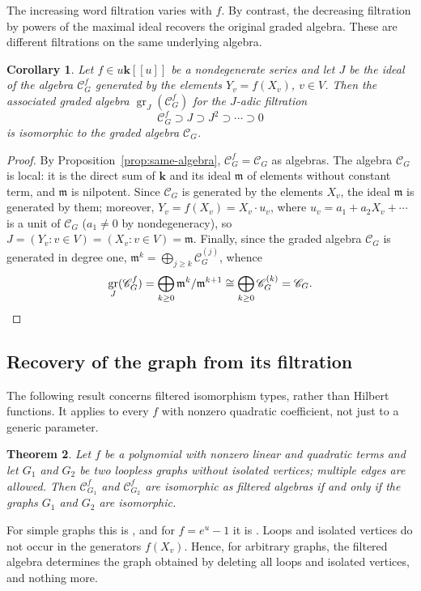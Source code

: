 \documentclass[reqno]{article}
\theoremstyle{plain} %
\newtheorem{theorem}{Theorem}[section]
\newtheorem{corollary}[theorem]{Corollary}
\theoremstyle{definition}
\theoremstyle{remark}
\DeclareMathOperator{\gr}{gr}
\newcommand{\K} {\mathbf{k}}
\newcommand {\CC}{\mathscr{C}}
\numberwithin{equation}{section}
\begin{document}
The increasing word filtration varies with $f$. By contrast, the
decreasing filtration by powers of the maximal ideal recovers the
original graded algebra. These are different filtrations on the same
underlying algebra.


\begin{corollary}\label{cor:assoc-graded}
Let $f\in u\K[[u]]$ be a nondegenerate series and let $J$ be the ideal of the algebra $\CC_G^f$ generated by the elements $Y_v=f(X_v)$, $v\in V$.
Then the associated graded algebra $\gr_J(\CC_G^f)$ for the $J$-adic filtration
\[
\CC_G^f\supset J\supset J^2\supset \cdots \supset  0
\]
is isomorphic to the graded algebra $\CC_G$.
\end{corollary}
\begin{proof}
By Proposition~\ref{prop:same-algebra}, $\CC^f_G=\CC_G$ as algebras.  The algebra $\CC_G$ is local: it is the direct sum of $\K$ and its ideal $\mathfrak m$ of elements without constant term, and $\mathfrak m$ is nilpotent.  Since $\CC_G$ is generated by the elements $X_v$, the ideal $\mathfrak m$ is generated by them; moreover, $Y_v=f(X_v)=X_v\cdot u_v$, where $u_v=a_1+a_2X_v+\cdots$ is a unit of $\CC_G$ ($a_1\ne0$ by nondegeneracy), so $J=(Y_v : v\in V)=(X_v : v\in V)=\mathfrak m$.  Finally, since the graded algebra $\CC_G$ is generated in degree one, $\mathfrak m^k=\bigoplus_{j\ge k}\CC_G^{(j)}$, whence
\[
\gr_J(\CC^f_G)=\bigoplus_{k\ge0}\mathfrak m^k/\mathfrak m^{k+1}\cong\bigoplus_{k\ge0}\CC_G^{(k)}=\CC_G.
\qedhere
\]
\end{proof}


\subsection{Recovery of the graph from its filtration}
\label{sec:filtered-reconstruction}

The following result concerns filtered isomorphism types, rather than
Hilbert functions. It applies to every $f$ with nonzero quadratic
coefficient, not just to a generic parameter.

\begin{theorem}
\label{th:Isom-f}
Let $f$ be a polynomial with nonzero linear and quadratic terms and let
$G_1$ and $G_2$ be two loopless graphs without isolated vertices; multiple
edges are allowed.
Then  $\CC^f_{G_1}$ and $\CC^f_{G_2}$ are isomorphic as filtered algebras  if and  only if  the graphs $G_1$ and $G_2$ are isomorphic.
\end{theorem}

For simple graphs this is \cite[Theorem~6]{NSh}, and for $f=e^u-1$ it is
\cite[Theorem~5]{NSh}. Loops and isolated vertices do not occur in the
generators $f(X_v)$. Hence, for arbitrary graphs, the filtered algebra
determines the graph obtained by deleting all loops and isolated
vertices, and nothing more.
\end{document}
